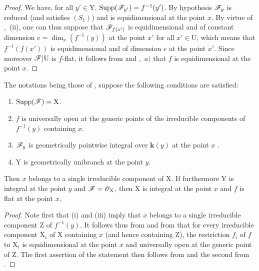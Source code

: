 \begin{proof}
\label{IV.15.3.2-proof}
We have, for all $y'\in\mathrm{Y}$, $\operatorname{Supp}(\mathscr{F}_{y'})=f^{-1}(y')$.
By hypothesis $\mathscr{F}_y$ is reduced (and satisfies $(S_1)$) and is equidimensional at the point $x$.
By virtue of ,~(ii), one can thus suppose that $\mathscr{F}_{f(x')}$ is equidimensional and of constant dimension $e=\dim_x(f^{-1}(y))$ at the point $x'$ for all $x'\in\mathrm{U}$, which means that $f^{-1}(f(x'))$ is equidimensional and of dimension $e$ at the point $x'$.
Since moreover $\mathscr{F}|\mathrm{U}$ is $f$-flat, it follows from  and ,~$a)$ that $f$ is equidimensional at the point $x$.
\end{proof}

\begin{corollary}[15.3.3]
\label{IV.15.3.3}
The notations being those of , suppose the following conditions are satisfied:
\begin{enumerate}[label=(\roman*)]
  \item $\operatorname{Supp}(\mathscr{F})=\mathrm{X}$.
  \item $f$ is universally open at the generic points of the irreducible components of $f^{-1}(y)$ containing $x$.
  \item $\mathscr{F}_y$ is geometrically pointwise integral over $\mathbf{k}(y)$ at the point $x$ .
  \item $\mathrm{Y}$ is geometrically unibranch at the point $y$.
\end{enumerate}
Then $x$ belongs to a single irreducible component of $\mathrm{X}$.
If furthermore $\mathrm{Y}$ is integral at the point $y$ and $\mathscr{F}=\mathscr{O}_\mathrm{X}$, then $\mathrm{X}$ is integral at the point $x$ and $f$ is flat at the point $x$.
\end{corollary}

\begin{proof}
\label{IV.15.3.3-proof}
Note first that (i) and (iii) imply that $x$ belongs to a single irreducible component $\mathrm{Z}$ of $f^{-1}(y)$.
It follows thus from  and from  that for every irreducible component $\mathrm{X}_i$ of $\mathrm{X}$ containing $x$ (and hence containing $\mathrm{Z}$), the restriction $f_i$ of $f$ to $\mathrm{X}_i$ is equidimensional at the point $x$ and universally open at the generic point of $\mathrm{Z}$.
The first assertion of the statement then follows from  and the second from .
\end{proof}

